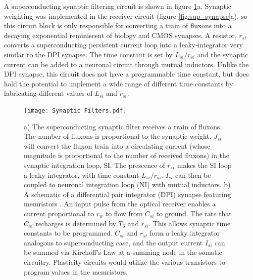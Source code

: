 \documentclass[twocolumn]{article}
\begin{document}
A superconducting synaptic filtering circuit is shown in figure \ref{fig:filtering}a. Synaptic weighting was implemented in the receiver circuit (figure \ref{fig:sup_synapse}a), so this circuit block is only responsible for converting a train of fluxons into a decaying exponential reminiscent of biology and CMOS synapses. A resistor, $r_{si}$ converts a superconducting persistent current loop into a leaky-integrator very similar to the DPI synapse. The time constant is set by $L_{si}/r_{si}$ and the synaptic current can be added to a neuronal circuit through mutual inductors. Unlike the DPI synapse, this circuit does not have a programmable time constant, but does hold the potential to implement a wide range of different time constants by fabricating different values of $L_{si}$ and $r_{si}$.



\begin{figure}
    \centering
    \texttt{[image: Synaptic Filters.pdf]}
    \caption{a) The superconducting synaptic filter receives a train of fluxons. The number of fluxons is proportional to the synaptic weight. $J_{si}$ will convert the fluxon train into a circulating current (whose magnitude is proportional to the number of received fluxons) in the synaptic integration loop, SI. The prescence of $r_{si}$ makes the SI loop a leaky integrator, with time constant $L_{si}/r_{si}$. $I_{si}$ can then be coupled to neuronal integration loop (NI) with mutual inductors. b) A schematic of a differential pair integrator (DPI) synapse featuring memristors \cite{dalgaty2019hybrid}. An input pulse from the optical receiver enables a current proportional to $r_w$ to flow from $C_{si}$ to ground. The rate that $C_{si}$ recharges is determined by $T_3$ and $r_{si}$. This allows synaptic time constants to be programmed. $C_{si}$ and $r_{si}$ form a leaky integrator analogous to superconducting case, and the output current $I_{si}$ can be summed via Kirchoff's Law at a summing node in the somatic circuitry. Plasticity circuits would utilize the various transistors to program values in the memristors.}
    \label{fig:filtering}
\end{figure}
\end{document}
